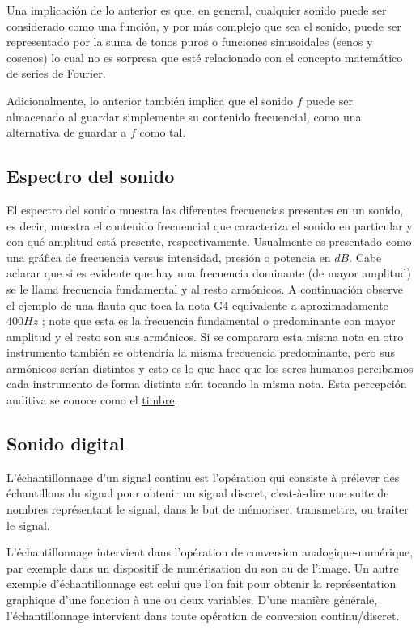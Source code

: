 \documentclass[conference,onecolumn]{IEEEtran}
\begin{document}
Una implicación de lo anterior es que, en general, cualquier sonido puede ser considerado como una función, y por más complejo que sea el sonido, puede ser representado por la suma de tonos puros o funciones sinusoidales (senos y cosenos) lo cual no es sorpresa que esté relacionado con el concepto matemático de series de Fourier. 

Adicionalmente, lo anterior también implica que el sonido $f$ puede ser almacenado al guardar simplemente su contenido frecuencial, como una alternativa de guardar a $f$ como tal.

\subsection{Espectro del sonido}
El espectro del sonido muestra las diferentes frecuencias presentes en un sonido, es decir, muestra el contenido frecuencial que caracteriza el sonido en particular y con qué amplitud está presente, respectivamente. Usualmente es presentado como una gráfica de frecuencia versus intensidad, presión o potencia en $dB$. Cabe aclarar que si es evidente que hay una frecuencia dominante (de mayor amplitud) se le llama frecuencia fundamental y al resto armónicos. A continuación observe el ejemplo de una flauta que toca la nota G4 equivalente a aproximadamente $400 Hz$ ; note que esta es la frecuencia fundamental o predominante con mayor amplitud y el resto son sus armónicos. Si se comparara esta misma nota en otro instrumento también se obtendría la misma frecuencia predominante, pero sus armónicos serían distintos y esto es lo que hace que los seres humanos percibamos cada instrumento de forma distinta aún tocando la misma nota. Esta percepción auditiva se conoce como el \underline{timbre}.


\subsection{Sonido digital}

L'échantillonnage d'un signal continu est l'opération qui consiste à prélever des échantillons du signal pour obtenir un signal discret, c'est-à-dire une suite de nombres représentant le signal, dans le but de mémoriser, transmettre, ou traiter le signal. 

L'échantillonnage intervient dans l'opération de conversion analogique-numérique, par exemple dans un dispositif de numérisation du son ou de l'image. Un autre exemple d'échantillonnage est celui que l'on fait pour obtenir la représentation graphique d'une fonction à une ou deux variables. D'une manière générale, l'échantillonnage intervient dans toute opération de conversion continu/discret. 
\end{document}
